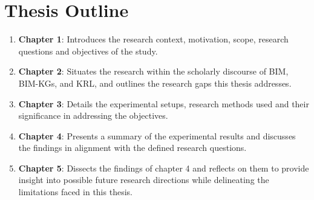 \section{Thesis Outline}
\begin{enumerate}

    \item 
    \textbf{Chapter 1}: Introduces the research context, motivation, scope, research questions and objectives of the study.

    \item 
    \textbf{Chapter 2}: Situates the research within the scholarly discourse of \ac{BIM}, \acp{BIM-KG}, and \ac{KRL}, and outlines the research gaps this thesis addresses.
    
    \item 
    \textbf{Chapter 3}: Details the experimental setups, research methods used and their significance in addressing the objectives.

    \item 
    \textbf{Chapter 4}: Presents a summary of the experimental results and discusses the findings in alignment with the defined research questions.

    \item
    \textbf{Chapter 5}: Dissects the findings of chapter 4 and reflects on them to provide insight into possible future research directions while delineating the limitations faced in this thesis.
\end{enumerate}

